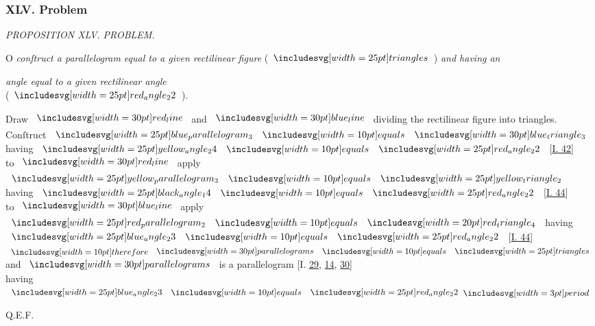\documentclass[11pt,preview]{standalone}
\begin{document}
\subsubsection{XLV. Problem}

\begin{minipage}[t]{0.43\textwidth}
    \vspace{20pt}
    
\end{minipage}%
\hfill
\begin{minipage}[t]{0.54\textwidth}
    \begin{center}
        \textit{PROPOSITION XLV. PROBLEM.}\label{book1pr45} \\
    \end{center}

    \hfill

    \begin{center}
        \raggedright \lettrine[lines=3, loversize=1, nindent=0pt]{}{}O \textit{conſtruct a parallelogram equal to a given rectilinear figure} (\hspace{-1ex}$\img{triangles}$\hspace{-1ex}) \textit{and having an}
    \end{center}
    \textit{angle equal to a given rectilinear angle}\\ (\hspace{-1ex}$\img{red_angle_22}$\hspace{-1ex}).
\end{minipage}

\hfill

\begin{center}
    Draw $\redline$ and $\blueline$ dividing the rectilinear figure into triangles.
    Conſtruct $\img{blue_parallelogram_3} \bequals \img[0][0][30]{blue_triangle_3}$ having $\img{yellow_angle_24} \bequals \img{red_angle_22}$ [\hyperref[book1pr42]{\textsc{I.} 42}]\\
    to $\redline$ apply $\img{yellow_parallelogram_3} \bequals \img{yellow_triangle_2}$ having  $\img{black_angle_14} \bequals \img{red_angle_22}$ [\hyperref[book1pr44]{\textsc{I.} 44}]\\
    to $\blueline$ apply $\img{red_parallelogram_2} \bequals \img[0][0][20]{red_triangle_4}$ having $\img{blue_angle_23} \bequals \img{red_angle_22}$ [\hyperref[book1pr44]{\textsc{I.} 44}]\\
    $\btherefore \img[0][0][30]{parallelograms} \bequals \img{triangles}$ and $\img[0][0][30]{parallelograms}$ is a parallelogram [\textsc{I.} \hyperref[book1pr29]{29}, \hyperref[book1pr14]{14}, \hyperref[book1pr30]{30}]\\
    having $\img{blue_angle_23} \bequals \img{red_angle_22} \bperiod$
\end{center}

\hfill

\hfill Q.E.F.
\end{document}
